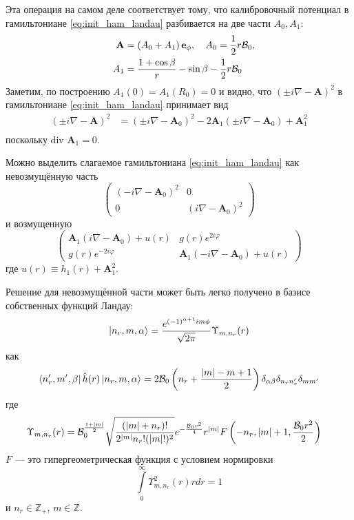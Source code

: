 \documentclass[a4paper,article,14pt]{extarticle}
\begin{document}
Эта операция на самом деле соответствует тому, что калибровочный потенциал в гамильтониане \eqref{eq:init_ham_landau} разбивается на две части $A_0,A_1$:
\begin{equation}
\begin{aligned}
\mathbf{A}  & = \left(A_0 + A_1  \right) \mathbf{e}_\phi, \quad A_0 =   \frac 1 2 r {\cal B}_{0} ,    \\
\quad A_1 & = \frac{1+  \cos\beta } { r } - \sin \beta - \frac 1 2 r {\cal B}_{0}     \\
\end{aligned}
\label{eq:devide_2_hamilte}
\end{equation}
Заметим, по построению $A_{1}(0) = A_{1}(R_{0}) = 0 $ и видно, что $(\pm i \nabla - \mathbf{A} ) ^ 2$  в гамильтониане \eqref{eq:init_ham_landau} принимает вид
\begin{equation}
\begin{aligned}
(\pm i \nabla - \mathbf{A} ) ^ 2 & = (\pm i \nabla - \mathbf{A}_0 ) ^ 2 - 
2 \mathbf{A}_1  (\pm i \nabla - \mathbf{A}_0 )+ \mathbf{A}_1^2   \\
\end{aligned}
\end{equation}
поскольку $ \mbox{div } \mathbf{A}_1=0$.

Можно выделить слагаемое гамильтониана \eqref{eq:init_ham_landau} как невозмущённую часть
$$
\begin{pmatrix} ( -i \nabla - \mathbf{A}_0 ) ^ 2 & 0 \\ 0 & ( i \nabla - \mathbf{A}_0 ) ^ 2 \end{pmatrix}
$$
и возмущенную
$$
\begin{pmatrix} \mathbf{A}_1  (i \nabla - \mathbf{A}_0 ) + u(r) & g (r) e^{2 i  \varphi} \\ g (r) e^{-2 i  \varphi} & \mathbf{A}_1  (-i \nabla - \mathbf{A}_0 ) + u(r) \end{pmatrix}
$$ 
где $u(r) \equiv  h_1(r) + \mathbf{A}_1^2$. 

Решение для невозмущённой части может быть легко получено в базисе собственных функций Ландау\cite{landau}:
\begin{equation}
\label{eq:basis_func_landau}
\ket{n_r, m, \alpha} = \frac{e^{(-1)^{\alpha+1}  i m \phi}} {\sqrt{2 \pi}} \Upsilon_{m,n_r} (r)
\end{equation}
как
$$
\bra{n_r', m', \beta} \hat h (r)  \ket{n_r, m, \alpha} = 2 {\cal B}_{0} \left( n_r + \frac{|m| - m + 1}{2} \right) \delta_{\alpha \beta} \delta_{n_r n'_r} \delta_{m m'} 
$$
\noindent где  
\begin{equation}
\begin{aligned}
\Upsilon_{m, n_r} (r) & = {\cal B}_{0}^{\frac{1+|m|}{2}} \sqrt{\frac{(|m| + n_r)!}{2^{|m|}n_r!(|m|!)^2}} e^{-\frac{{\cal B}_{0} r^2}{4}} r^{|m|} F\left(-n_r,|m| + 1,\frac{{\cal B}_{0} r^2 }{2} \right) 
\end{aligned}
\end{equation}
\noindent $F$  --- это гипергеометрическая функция с условием нормировки 
$$ \int\limits_0^\infty \Upsilon_{m, n_r}^2 (r) r dr = 1$$
и $n_r \in \mathbb{Z}_+$, $m \in \mathbb{Z}$.
\end{document}
